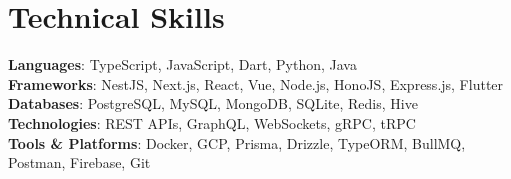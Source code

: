 \documentclass[letterpaper,11pt]{article}
\begin{document}
\section{Technical Skills}
 \begin{itemize}[leftmargin=0.15in, label={}]
    \small{\item{
     \textbf{Languages}{: TypeScript, JavaScript, Dart, Python, Java} \\
     \textbf{Frameworks}{: NestJS, Next.js, React, Vue, Node.js, HonoJS, Express.js, Flutter} \\
     \textbf{Databases}{: PostgreSQL, MySQL, MongoDB, SQLite, Redis, Hive} \\
     \textbf{Technologies}{: REST APIs, GraphQL, WebSockets, gRPC, tRPC} \\
     \textbf{Tools \& Platforms}{: Docker, GCP, Prisma, Drizzle, TypeORM, BullMQ, Postman, Firebase, Git} \\
    }}
 \end{itemize}


\end{document}
